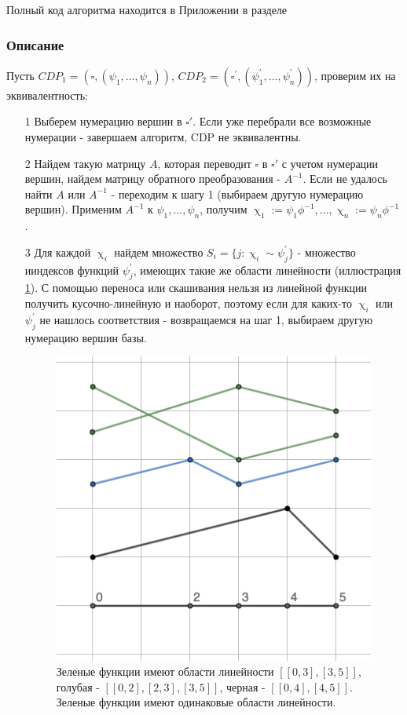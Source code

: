 \documentclass[fontsize=14pt]{scrartcl}
\theoremstyle{definition}
\begin{document}
Полный код алгоритма находится в Приложении в разделе \pageref{cdppy}


\subsubsection{Описание}

Пусть $CDP_1 = (\square, (\psi_1, \dots, \psi_n))$, $CDP_2 = (\square^{'}, (\psi^{'}_1, \dots, \psi^{'}_n))$, проверим их на эквивалентность:
\begin{itemize}
\item[1] Выберем нумерацию вершин в $\square'$. Если уже перебрали все возможные нумерации	- завершаем алгоритм, CDP не эквивалентны.
\item[2] Найдем такую матрицу $A$, которая переводит $\square$ в $\square'$ с учетом нумерации вершин, найдем матрицу обратного преобразования - $A^{-1}$. Если не удалось найти $A$ или $A^{-1}$ - переходим к шагу 1 (выбираем другую нумерацию вершин). Применим $A^{-1}$ к $\psi_1, ..., \psi_n$, получим $\upchi_1 := \psi_1\phi^{-1}, ..., \upchi_n := \psi_n\phi^{-1}$.
\item[3] Для каждой $\upchi_i$ найдем множество $S_i = \{j: \upchi_i \sim \psi^{'}_j\}$ - множество ииндексов функций $\psi^{'}_j$, имеющих такие же области линейности (иллюстрация \ref{eqclasses}). С помощью переноса или скашивания нельзя из линейной функции получить кусочно-линейную и наоборот, поэтому если для каких-то $\upchi_i$ или $\psi^{'}_j$ не нашлось соответствия - возвращаемся на шаг 1, выбираем другую нумерацию вершин базы.
\begin{figure}[!htb]
\centering
  \includegraphics[scale=0.5]{eqclasses.png}
  \caption{Зеленые функции имеют области линейности $[[0, 3], [3, 5]]$, голубая - $[[0, 2], [2, 3], [3, 5]]$, черная - $[[0, 4], [4, 5]]$. Зеленые функции имеют одинаковые области линейности.}\label{eqclasses}
\end{figure}


\end{itemize}
\end{document}
